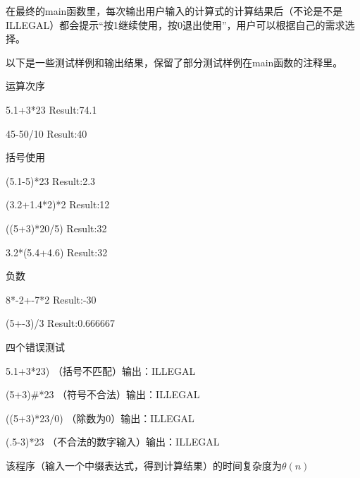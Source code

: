 \documentclass[UTF8]{ctexart}
\begin{document}
在最终的main函数里，每次输出用户输入的计算式的计算结果后（不论是不是ILLEGAL）都会提示“按1继续使用，按0退出使用”，用户可以根据自己的需求选择。

以下是一些测试样例和输出结果，保留了部分测试样例在main函数的注释里。

运算次序

5.1+3*23  Result:74.1

45-50/10  Result:40

括号使用 

(5.1-5)*23 Result:2.3

(3.2+1.4*2)*2 Result:12

((5+3)*20/5)   Result:32

3.2*(5.4+4.6) Result:32

负数

8*-2+-7*2 Result:-30

(5+-3)/3 Result:0.666667

四个错误测试

5.1+3*23)  （括号不匹配）输出：ILLEGAL


(5+3)\#*23   （符号不合法）输出：ILLEGAL

((5+3)*23/0) （除数为0）输出：ILLEGAL

(.5-3)*23  （不合法的数字输入）输出：ILLEGAL

该程序（输入一个中缀表达式，得到计算结果）的时间复杂度为$\theta(n)$
\end{document}

